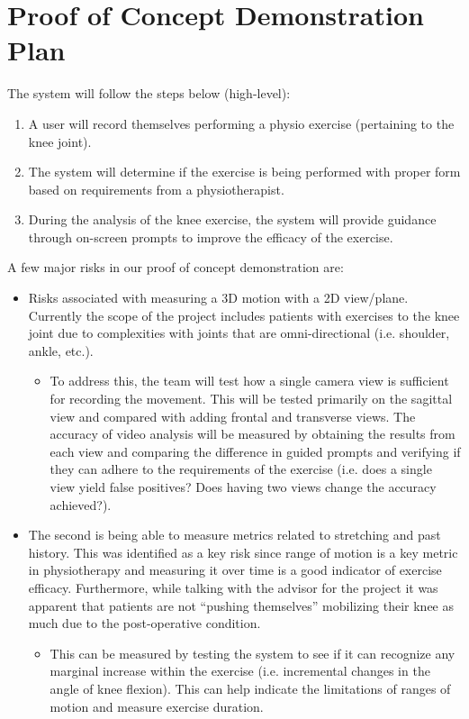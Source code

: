 \documentclass{article}
\begin{document}
\section{Proof of Concept Demonstration Plan}

The system will follow the steps below (high-level):
\begin{enumerate}
  \item A user will record themselves performing a physio exercise (pertaining to the knee joint).
  \item The system will determine if the exercise is being performed with proper form based on requirements from a physiotherapist.
  \item During the analysis of the knee exercise, the system will provide guidance through on-screen prompts to improve the efficacy of the exercise.
\end{enumerate}


\noindent A few major risks in our proof of concept demonstration are:
\begin{itemize}
  \item Risks associated with measuring a 3D motion with a 2D view/plane. Currently the scope of the project includes patients with exercises to the knee joint due to complexities with joints that are omni-directional (i.e. shoulder, ankle, etc.).
  \begin{itemize}
    \item To address this, the team will test how a single camera view is sufficient for recording the movement. This will be tested primarily on the sagittal view and compared with adding frontal and transverse views. The accuracy of video analysis will be measured by obtaining the results from each view and comparing the difference in guided prompts and verifying if they can adhere to the requirements of the exercise (i.e. does a single view yield false positives? Does having two views change the accuracy achieved?).
  \end{itemize}  
  \item The second is being able to measure metrics related to stretching and past history. This was identified as a key risk since range of motion is a key metric in physiotherapy and measuring it over time is a good indicator of exercise efficacy. Furthermore, while talking with the advisor for the project it was apparent that patients are not “pushing themselves” mobilizing their knee as much due to the post-operative condition.
  \begin{itemize}
    \item This can be measured by testing the system to see if it can recognize any marginal increase within the exercise (i.e. incremental changes in the angle of knee flexion). This can help indicate the limitations of ranges of motion and measure exercise duration.
  \end{itemize}
\end{itemize}
\end{document}
